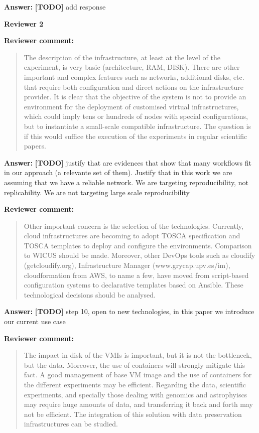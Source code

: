\documentclass{letter}
\newenvironment{review}%
{\textbf{Reviewer comment:}\begin{quote}}%
{\end{quote}}%
\newcommand{\todo}[1]{%
      \color{red}\textbf{[TODO]} #1\color{black}}
\newcommand{\answer}[1]{%
      \textbf{Answer:} #1}
\newcommand{\revised}[1]{\emph{#1}\color{black}}
\begin{document}
\begin{letter}{}
\answer{\todo{add response}}



\newpage

%
%
\textbf{Reviewer 2}


\begin{review}
The description of the infrastructure, at least at the level of the experiment, is very basic (architecture, RAM, DISK). There are other important and complex features such as networks, additional disks, etc. that require both configuration and direct actions on the infrastructure provider. It is clear that the objective of the system is not to provide an environment for the deployment of customised virtual infrastructures, which could imply tens or hundreds of nodes with special configurations, but to instantiate a small-scale compatible infrastructure. The question is if this would suffice the execution of the experiments in regular scientific papers.
\end{review}

\answer{\todo{justify that are evidences that show that many workflows fit in our approach (a relevante set of them). Justify that in this work we are assuming that we have a reliable network. We are targeting reproducibility, not replicability. We are not targeting large scale reproducibility}}

\revised{}


\begin{review}
Other important concern is the selection of the technologies. Currently, cloud infrastructures are becoming to adopt TOSCA specification and TOSCA templates to deploy and configure the environments. Comparison to WICUS should be made. Moreover, other DevOps tools such as cloudify (getcloudify.org), Infrastructure Manager (www.grycap.upv.es/im), cloudformation from AWS, to name a few, have moved from script-based configuration systems to declarative templates based on Ansible. These technological decisions should be analysed.
\end{review}

\answer{\todo{step 10, open to new technologies, in this paper we introduce our current use case}}


\begin{review}
The impact in disk of the VMIs is important, but it is not the bottleneck, but the data. Moreover, the use of containers will strongly mitigate this fact. A good management of base VM image and the use of containers for the different experiments may be efficient. Regarding the data, scientific experiments, and specially those dealing with genomics and astrophyiscs may require huge amounts of data, and transferring it back and forth may not be efficient. The integration of this solution with data preservation infrastructures can be studied.
\end{review}


\end{letter}
\end{document}
